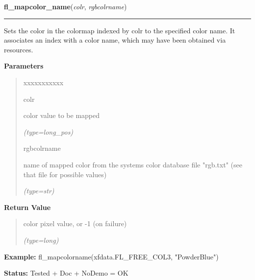     \label{xformslib:flbasic:fl_mapcolorname}

    \vspace{0.5ex}

\hspace{.8\funcindent}\begin{boxedminipage}{\funcwidth}

    \raggedright \textbf{fl\_mapcolor\_name}(\textit{colr}, \textit{rgbcolrname})

    \vspace{-1.5ex}

    \rule{\textwidth}{0.5\fboxrule}
\setlength{\parskip}{2ex}
    Sets the color in the colormap indexed by colr to the specified color 
    name. It associates an index with a color name, which may have been 
    obtained via resources.

\setlength{\parskip}{1ex}
      \textbf{Parameters}
      \vspace{-1ex}

      \begin{quote}
        \begin{Ventry}{xxxxxxxxxxx}

          \item[colr]

          color value to be mapped

            {\it (type=long\_pos)}

          \item[rgbcolrname]

          name of mapped color from the systems color database file 
          "rgb.txt" (see that file for possible values)

            {\it (type=str)}

        \end{Ventry}

      \end{quote}

      \textbf{Return Value}
    \vspace{-1ex}

      \begin{quote}
      color pixel value, or -1 (on failure)

      {\it (type=long)}

      \end{quote}

\textbf{Example:} fl\_mapcolorname(xfdata.FL\_FREE\_COL3, "PowderBlue")



\textbf{Status:} Tested + Doc + NoDemo = OK



    \end{boxedminipage}

